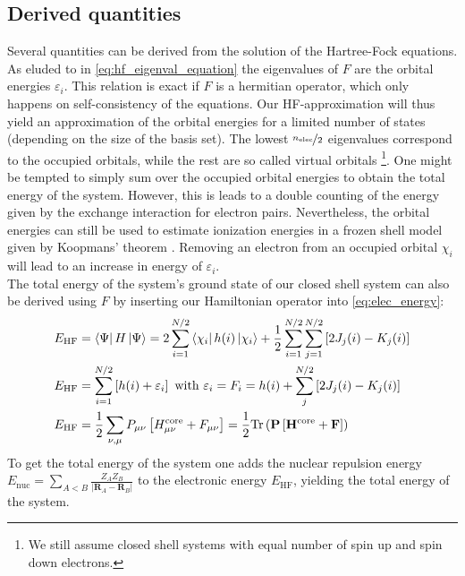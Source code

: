 \subsection{Derived quantities}
\label{subsec:background_hf_derived_quantities}
Several quantities can be derived from the solution of the Hartree-Fock equations. As eluded to in \autoref{eq:hf_eigenval_equation} the eigenvalues of $F$ are the orbital energies $\varepsilon_i$. This relation is exact if $F$ is a hermitian operator, which only happens on self-consistency of the equations. Our HF-approximation will thus yield an approximation of the orbital energies for a limited number of states (depending on the size of the basis set). The lowest $\nicefrac{n_\text{elec}}{2}$ eigenvalues correspond to the occupied orbitals, while the rest are so called virtual orbitals \footnote{We still assume closed shell systems with equal number of spin up and spin down electrons.}. One might be tempted to simply sum over the occupied orbital energies to obtain the total energy of the system. However, this is leads to a double counting of the energy given by the exchange interaction for electron pairs. Nevertheless, the orbital energies can still be used to estimate ionization energies in a frozen shell model given by Koopmans' theorem \parencite{ref:koopmans1934}. Removing an electron from an occupied orbital $\chi_i$ will lead to an increase in energy of $\varepsilon_i$.\\

The total energy of the system's ground state of our closed shell system can also be derived using $F$ by inserting our Hamiltonian operator into \autoref{eq:elec_energy}:
\begin{subequations}
\begin{align}
    E_\text{HF} &= \bra{\Psi} H \ket{\Psi} = 2\sum_{i=1}^{N/2} \bra{\chi_i} h(i) \ket{\chi_i}
    + \frac{1}{2}\sum_{i=1}^{N/2}\sum_{j=1}^{N/2} \left[ 2 J_j(i) - K_j(i) \right]\\
    E_\text{HF} &= \sum_{i=1}^{N/2}\left[ h(i) + \varepsilon_i\right] \text{  with  } \varepsilon_i = F_i =  h(i) + \sum_{j}^{N/2} \left[ 2 J_j(i) - K_j(i) \right]\\
    E_\text{HF} &= \frac{1}{2} \sum_{\nu, \mu} P_{\mu \nu} \left[ H_{\mu \nu}^\text{core} + F_{\mu \nu} \right] = \frac{1}{2} \text{Tr} \left( \mathbf{P} \left[ \mathbf{H}^\text{core} + \mathbf{F} \right] \right)
\end{align}
\end{subequations}
To get the total energy of the system one adds the nuclear repulsion energy $E_\text{nuc} = \sum_{A<B} \frac{Z_A Z_B}{|\mathbf{R}_A - \mathbf{R}_B|}$ to the electronic energy $E_\text{HF}$, yielding the total energy of the system.\\


